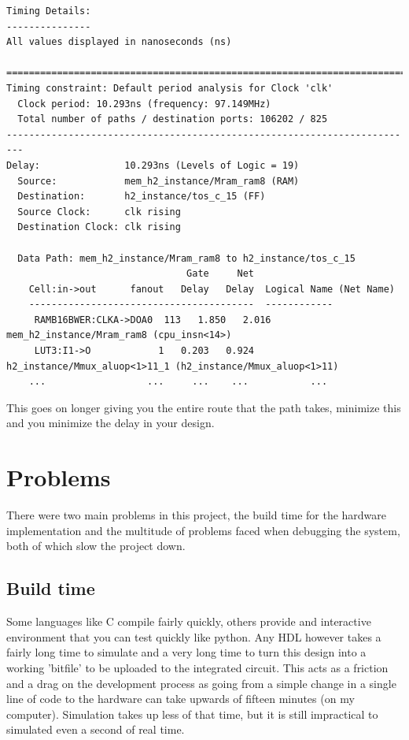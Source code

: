 \documentclass	[a4paper, 10pt]	{article}
\begin{document}
\begin{verbatim}
Timing Details:
---------------
All values displayed in nanoseconds (ns)

=========================================================================
Timing constraint: Default period analysis for Clock 'clk'
  Clock period: 10.293ns (frequency: 97.149MHz)
  Total number of paths / destination ports: 106202 / 825
-------------------------------------------------------------------------
Delay:               10.293ns (Levels of Logic = 19)
  Source:            mem_h2_instance/Mram_ram8 (RAM)
  Destination:       h2_instance/tos_c_15 (FF)
  Source Clock:      clk rising
  Destination Clock: clk rising

  Data Path: mem_h2_instance/Mram_ram8 to h2_instance/tos_c_15
                                Gate     Net
    Cell:in->out      fanout   Delay   Delay  Logical Name (Net Name)
    ----------------------------------------  ------------
     RAMB16BWER:CLKA->DOA0  113   1.850   2.016  mem_h2_instance/Mram_ram8 (cpu_insn<14>)
     LUT3:I1->O            1   0.203   0.924  h2_instance/Mmux_aluop<1>11_1 (h2_instance/Mmux_aluop<1>11)
    ...                  ...     ...    ...           ...
\end{verbatim}

  This goes on longer giving you the entire route that the path takes, minimize
  this and you minimize the delay in your design.

  \section{Problems}

    There were two main problems in this project, the build time for the hardware
    implementation and the multitude of problems faced when debugging the system,
    both of which slow the project down.

    \subsection{Build time}

    Some languages like C compile fairly quickly, others provide and interactive
    environment that you can test quickly like python. Any HDL however takes
    a fairly long time to simulate and a very long time to turn this design into
    a working 'bitfile' to be uploaded to the integrated circuit. This acts as
    a friction and a drag on the development process as going from a simple change
    in a single line of code to the hardware can take upwards of fifteen minutes
    (on my computer). Simulation takes up less of that time, but it is still
    impractical to simulated even a second of real time. 
\end{document}
